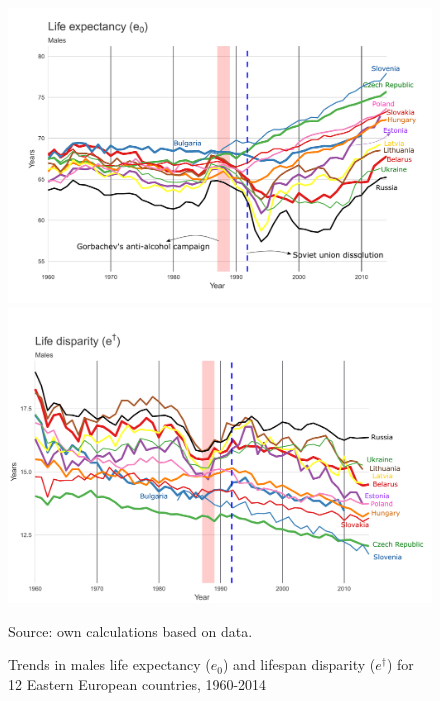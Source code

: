 \documentclass{article}
\begin{document}
\begin{figure}[h!]
\centering
\caption{Trends in males life expectancy ($e_0$) and lifespan disparity  ($e^{\dagger}$) for 12 Eastern European countries, 1960-2014}
\label{Fig_LE&LD}
\begin{center}
\includegraphics[scale=.40]{Figures/Figure_2A.pdf}
\includegraphics[scale=.40]{Figures/Figure_2B.pdf}
\end{center}
Source: own calculations based on \citet{HMD} data. 
\end{figure}

\newpage
\end{document}
